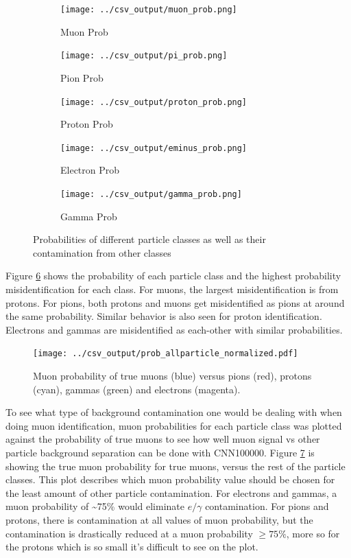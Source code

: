 \begin{figure}
\centering
	\begin{subfigure}[b]{.475\textwidth}
		\centering
		\texttt{[image: ../csv\_output/muon\_prob.png]}
		\caption{Muon Prob}
		\label{fig:muonprob}
	\end{subfigure}
	\begin{subfigure}[b]{.475\textwidth}
		\centering
		\texttt{[image: ../csv\_output/pi\_prob.png]}
		\caption{Pion Prob}
		\label{fig:piprob}
	\end{subfigure}
	\begin{subfigure}[b]{.475\textwidth}
		\centering
		\texttt{[image: ../csv\_output/proton\_prob.png]}
		\caption{Proton Prob}
		\label{fig:pprob}
	\end{subfigure}
	\begin{subfigure}[b]{.475\textwidth}
		\centering
		\texttt{[image: ../csv\_output/eminus\_prob.png]}
		\caption{Electron Prob}
		\label{fig:eminusprob}
	\end{subfigure}
	\begin{subfigure}[b]{.475\textwidth}
		\centering
		\texttt{[image: ../csv\_output/gamma\_prob.png]}
		\caption{Gamma Prob}
		\label{fig:gammaprob}
	\end{subfigure}
\caption{Probabilities of different particle classes as well as their contamination from other classes}
\label{fig:particleprob}
\end{figure}
Figure \ref{fig:particleprob} shows the probability of each particle class and the highest probability misidentification for each class. For muons, the largest misidentification is from protons. For pions, both protons and muons get misidentified as pions at around the same probability. Similar behavior is also seen for proton identification. Electrons and gammas are misidentified as each-other with similar probabilities.  



\begin{figure}[htp]
\centering
\texttt{[image: ../csv\_output/prob\_allparticle\_normalized.pdf]}
\caption{Muon probability of true muons (blue) versus pions (red), protons (cyan), gammas (green) and electrons (magenta).}
\label{fig:prob}
\end{figure}
To see what type of background contamination one would be dealing with when doing muon identification, muon probabilities for each particle class was plotted against the probability of true muons to see how well muon signal vs other particle background separation can be done with CNN100000. Figure \ref{fig:prob} is showing the true muon probability for true muons, versus the rest of the particle classes. This plot describes which muon probability value should be chosen for the least amount of other particle contamination. For electrons and gammas, a muon probability of \sim 75\% would eliminate $e/\gamma$ contamination. For pions and protons, there is contamination at all values of muon probability, but the contamination is drastically reduced at a muon probability $\geq 75\%$, more so for the protons which is so small it's difficult to see on the plot.
 
